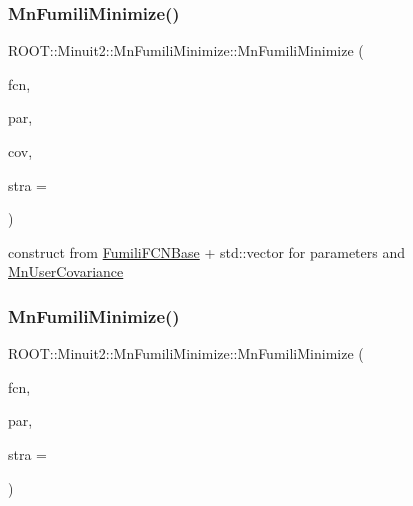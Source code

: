 \subsubsection{\texorpdfstring{MnFumiliMinimize()}{MnFumiliMinimize()}\hspace{0.1cm}{\footnotesize\ttfamily [17/21]}}
{\footnotesize\ttfamily R\+O\+O\+T\+::\+Minuit2\+::\+Mn\+Fumili\+Minimize\+::\+Mn\+Fumili\+Minimize (\begin{DoxyParamCaption}\item[{const \mbox{\hyperlink{classROOT_1_1Minuit2_1_1FumiliFCNBase}{Fumili\+F\+C\+N\+Base}} \&}]{fcn,  }\item[{const std\+::vector$<$ double $>$ \&}]{par,  }\item[{const \mbox{\hyperlink{classROOT_1_1Minuit2_1_1MnUserCovariance}{Mn\+User\+Covariance}} \&}]{cov,  }\item[{unsigned int}]{stra = {} }\end{DoxyParamCaption})\hspace{0.3cm}{\ttfamily [inline]}}



construct from \mbox{\hyperlink{classROOT_1_1Minuit2_1_1FumiliFCNBase}{Fumili\+F\+C\+N\+Base}} + std\+::vector for parameters and \mbox{\hyperlink{classROOT_1_1Minuit2_1_1MnUserCovariance}{Mn\+User\+Covariance}} 

\mbox{\label{classROOT_1_1Minuit2_1_1MnFumiliMinimize_aec4f0adff373393b4023f3a783b7d4bd}} 
\subsubsection{\texorpdfstring{MnFumiliMinimize()}{MnFumiliMinimize()}\hspace{0.1cm}{\footnotesize\ttfamily [18/21]}}
{\footnotesize\ttfamily R\+O\+O\+T\+::\+Minuit2\+::\+Mn\+Fumili\+Minimize\+::\+Mn\+Fumili\+Minimize (\begin{DoxyParamCaption}\item[{const \mbox{\hyperlink{classROOT_1_1Minuit2_1_1FumiliFCNBase}{Fumili\+F\+C\+N\+Base}} \&}]{fcn,  }\item[{const \mbox{\hyperlink{classROOT_1_1Minuit2_1_1MnUserParameters}{Mn\+User\+Parameters}} \&}]{par,  }\item[{unsigned int}]{stra = {} }\end{DoxyParamCaption})\hspace{0.3cm}{\ttfamily [inline]}}



